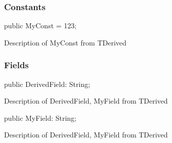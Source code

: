 \documentclass{report}
\newif\ifpdf
\begin{document}
\subsubsection*{\large{\textbf{Constants}}\normalsize\hspace{1ex}\hfill}
\begin{list}{}{
\setlength{\itemindent}{0cm}
\setlength{\listparindent}{0cm}
\setlength{\leftmargin}{\evensidemargin}
\addtolength{\leftmargin}{\tmplength}
\settowidth{\labelsep}{X}
\addtolength{\leftmargin}{\labelsep}
\setlength{\labelwidth}{\tmplength}
}
\label{ok_inherited_members_hide_ancestor.TDerived-MyConst}
\item[\textbf{MyConst}\hfill]
\ifpdf
\begin{flushleft}
\fi
\begin{ttfamily}
public MyConst = 123;\end{ttfamily}

\ifpdf
\end{flushleft}
\fi


\par Description of MyConst from TDerived\end{list}
\subsubsection*{\large{\textbf{Fields}}\normalsize\hspace{1ex}\hfill}
\begin{list}{}{
\setlength{\itemindent}{0cm}
\setlength{\listparindent}{0cm}
\setlength{\leftmargin}{\evensidemargin}
\addtolength{\leftmargin}{\tmplength}
\settowidth{\labelsep}{X}
\addtolength{\leftmargin}{\labelsep}
\setlength{\labelwidth}{\tmplength}
}
\label{ok_inherited_members_hide_ancestor.TDerived-DerivedField}
\item[\textbf{DerivedField}\hfill]
\ifpdf
\begin{flushleft}
\fi
\begin{ttfamily}
public DerivedField: String;\end{ttfamily}

\ifpdf
\end{flushleft}
\fi


\par Description of DerivedField, MyField from TDerived\label{ok_inherited_members_hide_ancestor.TDerived-MyField}
\item[\textbf{MyField}\hfill]
\ifpdf
\begin{flushleft}
\fi
\begin{ttfamily}
public MyField: String;\end{ttfamily}

\ifpdf
\end{flushleft}
\fi


\par Description of DerivedField, MyField from TDerived\end{list}
\end{document}
